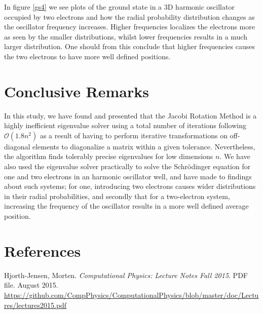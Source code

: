 	In figure \ref{gs4} we see plots of the ground state in a 3D harmonic oscillator occupied by two electrons and how the radial probability distribution changes as the oscillator frequency increases. Higher frequencies localizes the electrons more as seen by the smaller distributions, whilst lower frequencies results in a much larger distribution. One should from this conclude that higher frequencies causes the two electrons to have more well defined positions. 
	\section{Conclusive Remarks}
	In this study, we have found and presented that the Jacobi Rotation Method is a highly inefficient eigenvalue solver using a total number of iterations following $\mathcal{O}(1.8n^2)$ as a result of having to perform iterative transformations on off-diagonal elements to diagonalize a matrix within a given tolerance. Nevertheless, the algorithm finds tolerably precise eigenvalues for low dimensions $n$. We have also used the eigenvalue solver practically to solve the Schrödinger equation for one and two electrons in an harmonic oscillator well, and have made to findings about such systems; for one, introducing two electrons causes wider distributions in their radial probabilities, and secondly that for a two-electron system, increasing the frequency of the oscillator results in a more well defined average position. 
	\section{References}
	Hjorth-Jensen, Morten. \textit{Computational Physics: Lecture Notes Fall 2015}. PDF file. August 2015. \url{https://github.com/CompPhysics/ComputationalPhysics/blob/master/doc/Lectures/lectures2015.pdf}

